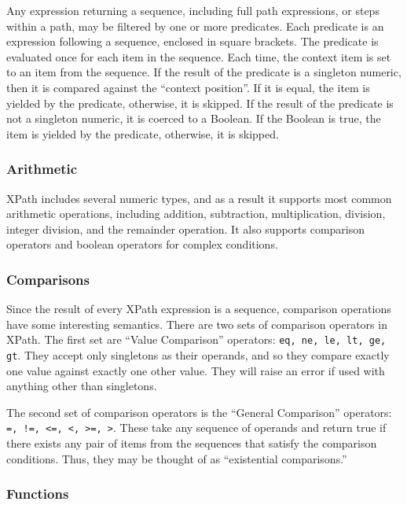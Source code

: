 \documentclass{article}
\begin{document}
Any expression returning a sequence, including full path expressions, or steps
within a path, may be filtered by one or more predicates. Each predicate is an
expression following a sequence, enclosed in square brackets. The predicate is
evaluated once for each item in the sequence. Each time, the context item is set
to an item from the sequence. If the result of the predicate is a singleton
numeric, then it is compared against the ``context position''. If it is equal,
the item is yielded by the predicate, otherwise, it is skipped. If the result of
the predicate is not a singleton numeric, it is coerced to a Boolean. If the
Boolean is true, the item is yielded by the predicate, otherwise, it is skipped.

\subsubsection{Arithmetic}

XPath includes several numeric types, and as a result it supports most common
arithmetic operations, including addition, subtraction, multiplication,
division, integer division, and the remainder operation. It also supports
comparison operators and boolean operators for complex conditions.

\subsubsection{Comparisons}

Since the result of every XPath expression is a sequence, comparison operations
have some interesting semantics. There are two sets of comparison operators in
XPath. The first set are ``Value Comparison'' operators: \texttt{eq, ne, le, lt,
  ge, gt}. They accept only singletons as their operands, and so they compare
exactly one value against exactly one other value. They will raise an error if
used with anything other than singletons.

The second set of comparison operators is the ``General Comparison'' operators:
\texttt{=, !=, <=, <, >=, >}. These take any sequence of operands and return
true if there exists any pair of items from the sequences that satisfy the
comparison conditions. Thus, they may be thought of as ``existential
comparisons.''

\subsubsection{Functions}
\end{document}
